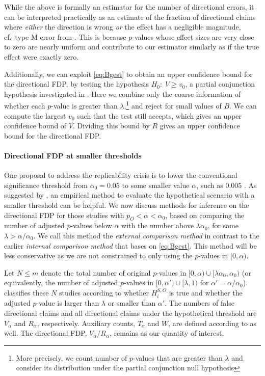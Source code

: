 \documentclass[aoas, preprint]{imsart}
\theoremstyle{definition}
\theoremstyle{custom}
\newcommand{\ao}{\alpha_0}
\begin{document}
  While the above is formally an estimator for the number of directional errors, it can be interpreted practically as an estimate of the fraction of directional claims where {\em either} the direction is wrong {\em or} the effect has a negligible magnitude, cf.\ type M error from \citet{Gelman:2014cd}. This is because $p$-values whose effect sizes are very close to zero are nearly uniform and contribute to our estimator similarly as if the true effect were exactly zero.

  Additionally, we can exploit \eqref{eq:Bgest} to obtain an upper confidence bound for the directional FDP, by testing the hypothesis $H_0:\; V \ge v_0$, a partial conjunction hypothesis investigated in \citet{Heller:2007}. Here we combine only the coarse information of whether each $p$-value is greater than $\lambda$,\footnote{More precisely, we count number of $p$-values that are greater than $\lambda$ and consider its distribution under the partial conjunction null hypothesis} and reject for small values of $B$. We can compute the largest $v_0$ such that the test still accepts, which gives an upper confidence bound of $V$. Dividing this bound by $R$ gives an upper confidence bound for the directional FDP.

  \paragraph{Directional FDP at smaller thresholds} One proposal to address the replicability crisis is to lower the conventional significance threshold from $\ao=0.05$ to some smaller value $\alpha$, such as $0.005$ \citep{Benjamin:2018gh}. As suggested by \citet{Goodman:2013kj}, an empirical method to evaluate the hypothetical scenario with a smaller threshold can be helpful. We now discuss methods for inference on the directional FDP for those studies with $p_O < \alpha < \ao$, based on comparing the number of adjusted $p$-values below $\alpha$ with the number above $\lambda\ao$, for some $\lambda > \alpha/\ao$. We call this method the {\em external comparison method} in contrast to the earlier {\em internal comparison method} that bases on \eqref{eq:Bgest}. This method will be less conservative as we are not constrained to only using the $p$-values in $[0, \alpha)$.
  
  Let $N \le m$ denote the total number of original $p$-values in $[0,\alpha) \cup [\lambda\ao, \ao)$ (or equivalently, the number of adjusted $p$-values in $[0,\alpha') \cup [\lambda, 1)$ for $\alpha' = \alpha/\ao$).  classifies these $N$ studies according to whether $H_i^{S,O}$ is true and whether the adjusted $p$-value is larger than $\lambda$ or smaller than $\alpha'$. The numbers of false directional claims and all directional claims under the hypothetical threshold are $V_\alpha$ and $R_\alpha$, respectively. Auxiliary counts, $T_\alpha$ and $W$, are defined according to  as well. The directional FDP, $V_\alpha / R_\alpha$, remains as our quantity of interest.
  
\end{document}
